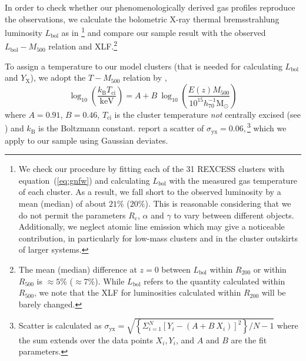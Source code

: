 \documentclass[traditabstract]{aa}
\newcommand{\rmn}{\mathrm}
\begin{document}
In order to check whether our phenomenologically derived gas profiles reproduce
the observations, we calculate the bolometric X-ray thermal bremsstrahlung
luminosity $L_{\rmn{bol}}$ as in \cite{1988xrec.book.....S}\footnote[5]{We check
  our procedure by fitting each of the 31 REXCESS clusters with
  equation~(\ref{eq:gnfw}) and calculating $L_{\rmn{bol}}$ with the measured gas
  temperature of each cluster. As a result, we fall short to the observed
  luminosity by a mean (median) of about $21\%$ ($20\%$). This is reasonable
  considering that we do not permit the parameters $R_{\rmn{c}}$, $\alpha$ and
  $\gamma$ to vary between different objects. Additionally, we neglect atomic
  line emission which may give a noticeable contribution, in particularly for
  low-mass clusters and in the cluster outskirts of larger systems.}  and
compare our sample result with the observed $L_{\rmn{bol}} - M_{500}$ relation
and XLF.\footnote[6]{The mean (median) difference at $z=0$ between
  $L_{\rmn{bol}}$ within $R_{200}$ or within $R_{500}$ is $\approx 5\%$ ($\approx
  7\%$). While $L_{\rmn{bol}}$ refers to the quantity calculated within
  $R_{500}$, we note that the XLF for luminosities calculated within $R_{200}$
  will be barely changed.}

To assign a temperature to our model clusters (that is needed for calculating
$L_{\rmn{bol}}$ and $Y_{\rmn{X}}$), we adopt the $T-M_{500}$ relation by
\cite{2010MNRAS.406.1773M},
\begin{equation}
\log_{10} \left( \frac{k_{\rmn{B}}T_{\rmn{ci}}}{\rmn{keV}} \right) = 
A + B~\log_{10} \left( \frac{E(z) M_{500}}{10^{15} h_{70}^{-1} \rmn{M_{\odot}}} \right)
\label{eq:temp}
\end{equation}
where $A=0.91$, $B=0.46$, $T_{\rmn{ci}}$ is the cluster temperature \emph{not}
centrally excised (see \citealp{2010MNRAS.406.1773M}) and $k_{\rmn{B}}$ is the
Boltzmann constant. \cite{2010MNRAS.406.1773M} report a scatter of
$\sigma_{\rmn{yx}} = 0.06,$\footnote[7]{Scatter is calculated as
  $\sigma_{\rmn{yx}} = \sqrt{ \left\{ \Sigma_{i=1}^{N} [Y_{i}-(A+B~X_{i})]^{2}\right\} /
    N-1}$ where the sum extends over the data points $X_{i}, Y_{i}$, and $A$ and $B$
  are the fit parameters.} which we apply to our sample using Gaussian
deviates.
\end{document}
